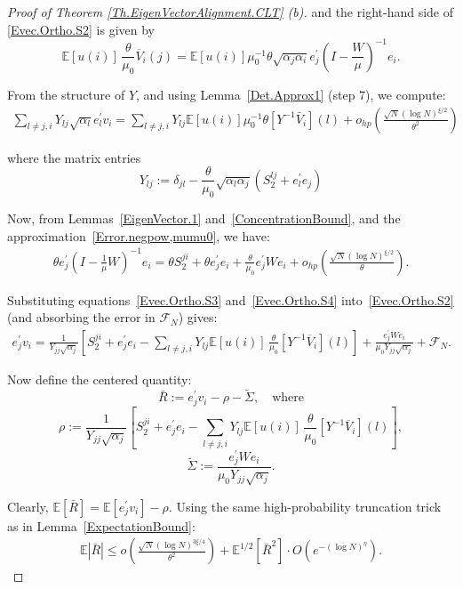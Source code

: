 \documentclass[11pt, reqno]{amsart}
\numberwithin{equation}{section}
\begin{document}
\begin{proof}[Proof of Theorem \ref{Th.EigenVectorAlignment.CLT} (b)]
and the right-hand side of \eqref{Evec.Ortho.S2} is given by
\[
\mathbb{E}[u(i)]\,\frac{\theta}{\mu_0} \overline{V}_i(j)=\mathbb E[u(i)]\mu_0^{-1}\theta\sqrt{\alpha_j\alpha_i}e_j^\prime\left(I-\frac{W}{\mu}\right)^{-1}e_i.
\]

From the structure of \(Y\), and using Lemma~\ref{Det.Approx1} (step 7), we compute:
\begin{align}
\label{Evec.Ortho.S3}\sum_{l \ne j,i}Y_{lj}\sqrt{\alpha_l}e_l^\prime v_i =  \sum_{l \ne j,i}Y_{lj}\mathbb E[u(i)]\mu_0^{-1}\theta \left[Y^{-1}\bar V_i\right](l) + o_{hp}\left(\frac{\sqrt{N}(\log N)^{\xi/2}}{\theta^2}\right)
\end{align}

where the matrix entries
\[
Y_{lj} := \delta_{jl} - \frac{\theta}{\mu_0} \sqrt{\alpha_l \alpha_j} (S_2^{lj} + e_l^\prime e_j)
\]

Now, from Lemmas~\ref{EigenVector.1} and~\ref{ConcentrationBound}, and the approximation~\eqref{Error.negpow,mumu0}, we have:
\begin{align}
\label{Evec.Ortho.S4}
\theta e_j^\prime \left(I - \frac{1}{\mu} W\right)^{-1} e_i 
= \theta S_2^{ji} + \theta e_j^\prime e_i + \frac{\theta}{\mu_0} e_j^\prime W e_i +  o_{hp}\left(\frac{\sqrt{N} (\log N)^{\xi/2}}{\theta}\right).
\end{align}

Substituting equations~\eqref{Evec.Ortho.S3} and~\eqref{Evec.Ortho.S4} into~\eqref{Evec.Ortho.S2} (and absorbing the error in $\mathcal F_N$) gives:
\begin{align}
\label{Evec.Ortho.detcent}
e_j^\prime v_i = \frac{1}{Y_{jj} \sqrt{\alpha_j}} \left[ S_2^{ji} + e_j^\prime e_i - \sum_{l \ne j,i} Y_{lj} \mathbb{E}[u(i)]\,\frac{\theta}{\mu_0} \left[Y^{-1} \overline{V}_i \right](l) \right] + \frac{e_j^\prime W e_i}{\mu_0 Y_{jj} \sqrt{\alpha_j}} + \mathcal{F}_N.
\end{align}

Now define the centered quantity:
\[
\bar{R} := e_j^\prime v_i - \rho - \widetilde{\Sigma}, \quad \text{where}
\]
\[
\rho := \frac{1}{Y_{jj} \sqrt{\alpha_j}} \left[ S_2^{ji} + e_j^\prime e_i - \sum_{l \ne j,i} Y_{lj} \mathbb{E}[u(i)]\,\frac{\theta}{\mu_0} \left[Y^{-1} \overline{V}_i \right](l) \right],
\]
\[
\widetilde{\Sigma} := \frac{e_j^\prime W e_i}{\mu_0 Y_{jj} \sqrt{\alpha_j}}.
\]

Clearly, \(\mathbb{E}[\bar{R}] = \mathbb{E}[e_j^\prime v_i] - \rho\). Using the same high-probability truncation trick as in Lemma~\ref{ExpectationBound}:
\begin{align*}
\mathbb{E}|\bar{R}| 
\le o\left( \frac{\sqrt{N}(\log N)^{3\xi/4}}{\theta^2} \right) + \mathbb{E}^{1/2}[\bar{R}^2] \cdot O\left(e^{-(\log N)^\eta}\right).
\end{align*}


\end{proof}
\end{document}
